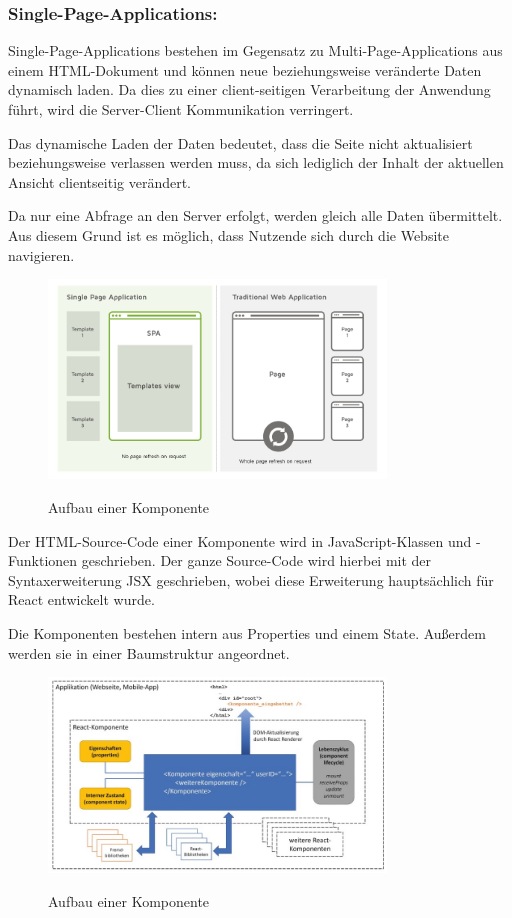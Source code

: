 \subsubsection{Single-Page-Applications:}

Single-Page-Applications bestehen im Gegensatz zu Multi-Page-Applications aus einem HTML-Dokument und können neue beziehungsweise veränderte Daten dynamisch laden. Da dies zu einer client-seitigen Verarbeitung der Anwendung führt, wird die Server-Client Kommunikation verringert.

Das dynamische Laden der Daten bedeutet, dass die Seite nicht aktualisiert beziehungsweise verlassen werden muss, da sich lediglich der Inhalt der aktuellen Ansicht clientseitig verändert.

Da nur eine Abfrage an den Server erfolgt, werden gleich alle Daten übermittelt. Aus diesem Grund ist es möglich, dass Nutzende sich durch die Website navigieren.

\cite{vergleichSPAundMPA} \cite{T3NReact}

\begin{figure}[H]
  \centering
  \includegraphics[width=0.8\textwidth]{pics/vergleichSPA-MPA.png}
  \caption{Aufbau einer Komponente}
  \cite{vergleichSPAundMPA}
\end{figure}

Der HTML-Source-Code einer Komponente wird in JavaScript-Klassen und -Funktionen geschrieben. Der ganze Source-Code wird hierbei mit der Syntaxerweiterung JSX geschrieben, wobei diese Erweiterung hauptsächlich für React entwickelt wurde.

Die Komponenten bestehen intern aus Properties und einem State. Außerdem werden sie in einer Baumstruktur angeordnet.
\cite{WasIstReact}

\begin{figure}[H]
  \centering
  \includegraphics[width=0.8\textwidth]{pics/aufbauReactComponent.jpg}
  \caption{Aufbau einer Komponente}
  \cite{WasIstReact}
\end{figure}

